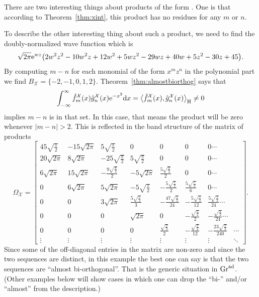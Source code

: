 \documentclass[10pt,a4paper]{amsart}
\numberwithin{equation}{section}
\theoremstyle{definition}
\def\X{\mathcal{X}}
\def\ff{\hat f}
\def\gg{\hat g}
\begin{document}
There are two interesting things about products of the form
\smash{$
\ff_m^{\X}(x)\gg_n^{\X}(x){\rm e}^{-\frac{x^2}{2}}$}.
One is that according to Theorem~\ref{thm:xint}, this product has no residues for any $m$ or $n$.

To describe the other interesting thing about such a product, we need
to find the doubly-normalized wave function
\smash{$\hat{\hat\psi}_{\X}(x,0,z)$} which is
\begin{align*}
\sqrt{2\pi} {\rm e}^{w z}
 \bigl(2 w^2 z^2-10 w^2 z+12
 w^2+5 w z^2-29 w z+40 w+5
 z^2-30 z+45\bigr).
\end{align*}
By computing $m-n$ for each monomial of the form $x^mz^n$ in the
polynomial part we find
$
B_{\X}=\{-2,-1,0,1,2\}$.
Theorem~\ref{thm:almostbiorthog} says that
\[\int_{-\infty}^{\infty}\ff_m^{\X}(x)\gg_n^{\X}(x){\rm e}^{-x^2}{\rm d}x=\big\langle \ff_m^{\X}(x),\gg_n^{\X}(x)\big\rangle_{\rm H}\not=0\]
implies $m-n$ is in that set. In this case, that means
the product will be zero whenever $|m-n|>2$.
This is reflected in the band structure of the matrix of products
\[
\Omega_{\X}=\left[
 \begin{matrix}
 45 \sqrt{\frac{\pi }{2}} &
 -15 \sqrt{2 \pi } & 5
 \sqrt{\frac{\pi }{2}} & 0 &
 0 & 0 & 0 \cdots \\
 20 \sqrt{2 \pi } & 8 \sqrt{2
 \pi } & -25 \sqrt{\frac{\pi
 }{2}} & 5 \sqrt{\frac{\pi
 }{2}} & 0 & 0 & 0 \cdots \\
 6 \sqrt{2 \pi } & 15 \sqrt{2
 \pi } & -\frac{9
 \sqrt{\frac{\pi }{2}}}{2} &
 -5 \sqrt{2 \pi } & \frac{5
 \sqrt{\frac{\pi }{2}}}{2} &
 0 & 0 \cdots \\
 0 & 6 \sqrt{2 \pi } & 5
 \sqrt{2 \pi } & -5
 \sqrt{\frac{\pi }{2}} &
 -\frac{5 \sqrt{\frac{\pi
 }{2}}}{2} & \frac{5
 \sqrt{\frac{\pi }{2}}}{6} &
 0 \cdots \\
 0 & 0 & 3 \sqrt{2 \pi } &
 \frac{5 \sqrt{\frac{\pi
 }{2}}}{3} & -\frac{47
 \sqrt{\frac{\pi }{2}}}{24}
 & -\frac{5 \sqrt{\frac{\pi
 }{2}}}{12} & \frac{5
 \sqrt{\frac{\pi }{2}}}{24}
 \cdots \\
 0 & 0 & 0 & \sqrt{2 \pi } & 0
 & -\frac{\sqrt{\frac{\pi
 }{2}}}{2} &
 -\frac{\sqrt{\frac{\pi
 }{2}}}{24}\cdots \\
 0 & 0 & 0 & 0 &
 \frac{\sqrt{\frac{\pi
 }{2}}}{2} &
 -\frac{\sqrt{\frac{\pi
 }{2}}}{12} & -\frac{23
 \sqrt{\frac{\pi }{2}}}{240}&\cdots\\
 \vdots& \vdots& \vdots& \vdots& \vdots& \vdots& \vdots&\ddots
\end{matrix}
\right].
\]
Since some of the off-diagonal entries in the matrix are non-zero and
since the two sequences are distinct, in this example the best one can
say is that the two sequences are
``almost bi-orthogonal''. That is the generic situation in
${\rm Gr}^{\rm ad}$. (Other examples below will show
cases in which one can drop the ``bi-'' and/or ``almost'' from the description.)
\end{document}
